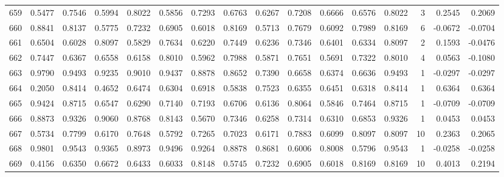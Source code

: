 \begin{tabular}{lrrrrrrrrrrrrrrr}
659 &      0.5477 &  0.7546 &  0.5994 &  0.8022 &  0.5856 &  0.7293 &  0.6763 &  0.6267 &  0.7208 &  0.6666 &   0.6576 &     0.8022 &      3 &                    0.2545 &                     0.2069 \\
660 &      0.8841 &  0.8137 &  0.5775 &  0.7232 &  0.6905 &  0.6018 &  0.8169 &  0.5713 &  0.7679 &  0.6092 &   0.7989 &     0.8169 &      6 &                   -0.0672 &                    -0.0704 \\
661 &      0.6504 &  0.6028 &  0.8097 &  0.5829 &  0.7634 &  0.6220 &  0.7449 &  0.6236 &  0.7346 &  0.6401 &   0.6334 &     0.8097 &      2 &                    0.1593 &                    -0.0476 \\
662 &      0.7447 &  0.6367 &  0.6558 &  0.6158 &  0.8010 &  0.5962 &  0.7988 &  0.5871 &  0.7651 &  0.5691 &   0.7322 &     0.8010 &      4 &                    0.0563 &                    -0.1080 \\
663 &      0.9790 &  0.9493 &  0.9235 &  0.9010 &  0.9437 &  0.8878 &  0.8652 &  0.7390 &  0.6658 &  0.6374 &   0.6636 &     0.9493 &      1 &                   -0.0297 &                    -0.0297 \\
664 &      0.2050 &  0.8414 &  0.4652 &  0.6474 &  0.6304 &  0.6918 &  0.5838 &  0.7523 &  0.6355 &  0.6451 &   0.6318 &     0.8414 &      1 &                    0.6364 &                     0.6364 \\
665 &      0.9424 &  0.8715 &  0.6547 &  0.6290 &  0.7140 &  0.7193 &  0.6706 &  0.6136 &  0.8064 &  0.5846 &   0.7464 &     0.8715 &      1 &                   -0.0709 &                    -0.0709 \\
666 &      0.8873 &  0.9326 &  0.9060 &  0.8768 &  0.8143 &  0.5670 &  0.7346 &  0.6258 &  0.7314 &  0.6310 &   0.6853 &     0.9326 &      1 &                    0.0453 &                     0.0453 \\
667 &      0.5734 &  0.7799 &  0.6170 &  0.7648 &  0.5792 &  0.7265 &  0.7023 &  0.6171 &  0.7883 &  0.6099 &   0.8097 &     0.8097 &     10 &                    0.2363 &                     0.2065 \\
668 &      0.9801 &  0.9543 &  0.9365 &  0.8973 &  0.9496 &  0.9264 &  0.8878 &  0.8681 &  0.6006 &  0.8008 &   0.5796 &     0.9543 &      1 &                   -0.0258 &                    -0.0258 \\
669 &      0.4156 &  0.6350 &  0.6672 &  0.6433 &  0.6033 &  0.8148 &  0.5745 &  0.7232 &  0.6905 &  0.6018 &   0.8169 &     0.8169 &     10 &                    0.4013 &                     0.2194 \\

\end{tabular}
